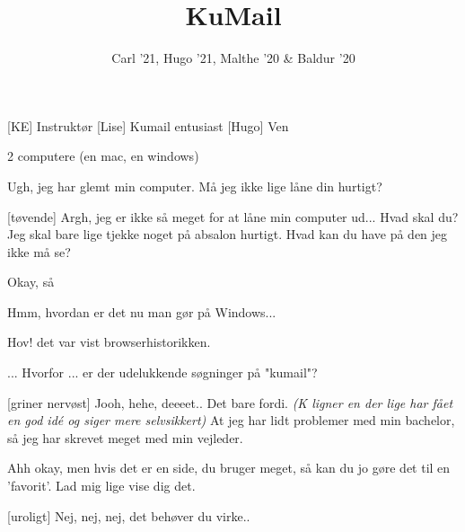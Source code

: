 \documentclass[a4paper,11pt]{article}
\title{KuMail}
\author{Carl '21, Hugo '21, Malthe '20 \& Baldur '20}
\begin{document}
\maketitle

\begin{roles}
[KE] Instruktør
[Lise] Kumail entusiast
[Hugo] Ven
\end{roles}

\begin{props}
\item 2 computere (en mac, en windows)
\end{props}
\begin{sketch}

 Ugh, jeg har glemt min computer. Må jeg ikke lige låne din hurtigt?

[tøvende] Argh, jeg er ikke så meget for at låne min computer ud... Hvad skal du?
 Jeg skal bare lige tjekke noget på absalon hurtigt. Hvad kan du have på den jeg ikke må se?


 Okay, så 


 Hmm, hvordan er det nu man gør på Windows...


 Hov! det var vist browserhistorikken.


 ... Hvorfor ... er der udelukkende søgninger på "kumail"?

[griner nervøst] Jooh, hehe, deeeet.. Det bare fordi. \textit{(K ligner en der lige har fået en god idé og siger mere selvsikkert)} At jeg har lidt problemer med min bachelor, så jeg har skrevet meget med min vejleder.

 Ahh okay, men hvis det er en side, du bruger meget, så kan du jo gøre det til en 'favorit'. Lad mig lige vise dig det.

[uroligt] Nej, nej, nej, det behøver du virke..


\end{sketch}
\end{document}
